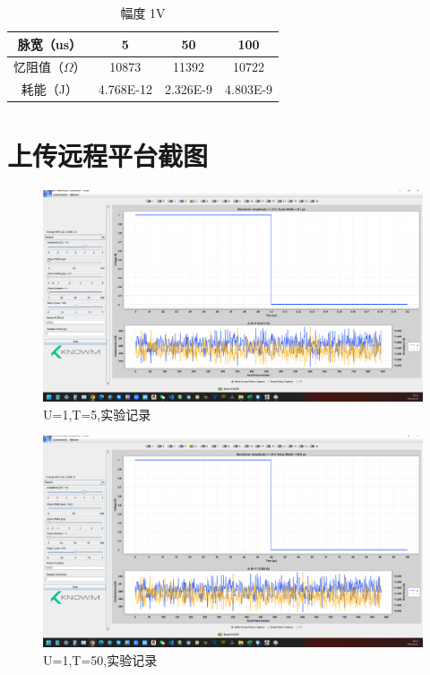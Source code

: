 \documentclass[12pt,hyperref,a4paper,UTF8]{ctexart}
\begin{document}
\begin{table}[H]
    \centering
    \caption{幅度 1V}
    \begin{tabular}{|c|c|c|c|}
        \hline
        脉宽（us） & 5 & 50 & 100 \\ \hline
        忆阻值（$\Omega$） & 10873&11392 &10722 \\ \hline
        耗能（J） & 4.768E-12&2.326E-9&4.803E-9 \\ \hline
    \end{tabular}
\end{table}




\section{上传远程平台截图}


\begin{figure}[H]
    \centering
    \begin{minipage}{1\textwidth}
        \centering
        \includegraphics[width=1\textwidth]{figures/U1T5.png}
        \caption{U=1,T=5,实验记录}
        \label{fig:system_block_diagram}
    \end{minipage}
\end{figure}

\begin{figure}[H]
    \centering
    \begin{minipage}{1\textwidth}
        \centering
        \includegraphics[width=1\textwidth]{figures/U1T50.png}
        \caption{U=1,T=50,实验记录}
        \label{fig:system_block_diagram}
    \end{minipage}
\end{figure}
\end{document}
